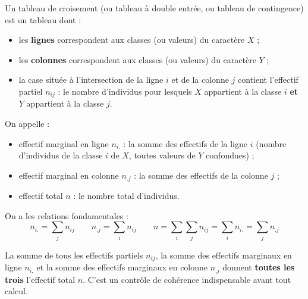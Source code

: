 \documentclass[11pt]{article}
\newcommand{\cle}[1]{{\popxbold\color{popdark}#1}}
\begin{document}
\begin{definition}
Un \cle{tableau de croisement} (ou \cle{tableau à double entrée}, ou tableau de contingence) est un tableau dont :
\begin{itemize}
\item les \textbf{lignes} correspondent aux classes (ou valeurs) du caractère $X$ ;
\item les \textbf{colonnes} correspondent aux classes (ou valeurs) du caractère $Y$ ;
\item la case située à l'intersection de la ligne $i$ et de la colonne $j$ contient l'\cle{effectif partiel} $n_{ij}$ : le nombre d'individus pour lesquels $X$ appartient à la classe $i$ \textbf{et} $Y$ appartient à la classe $j$.
\end{itemize}
\end{definition}

\begin{definition}
On appelle :
\begin{itemize}
\item \cle{effectif marginal en ligne} $n_{i.}$ : la somme des effectifs de la ligne $i$ (nombre d'individus de la classe $i$ de $X$, toutes valeurs de $Y$ confondues) ;
\item \cle{effectif marginal en colonne} $n_{.j}$ : la somme des effectifs de la colonne $j$ ;
\item \cle{effectif total} $n$ : le nombre total d'individus.
\end{itemize}
On a les relations fondamentales :
\[ n_{i.} = \sum_{j} n_{ij} \qquad n_{.j} = \sum_{i} n_{ij} \qquad n = \sum_{i}\sum_{j} n_{ij} = \sum_{i} n_{i.} = \sum_{j} n_{.j} \]
\end{definition}

\begin{aretenir}
La somme de tous les effectifs partiels $n_{ij}$, la somme des effectifs marginaux en ligne $n_{i.}$ et la somme des effectifs marginaux en colonne $n_{.j}$ donnent \textbf{toutes les trois} l'effectif total $n$. C'est un contrôle de cohérence indispensable avant tout calcul.
\end{aretenir}
\end{document}
